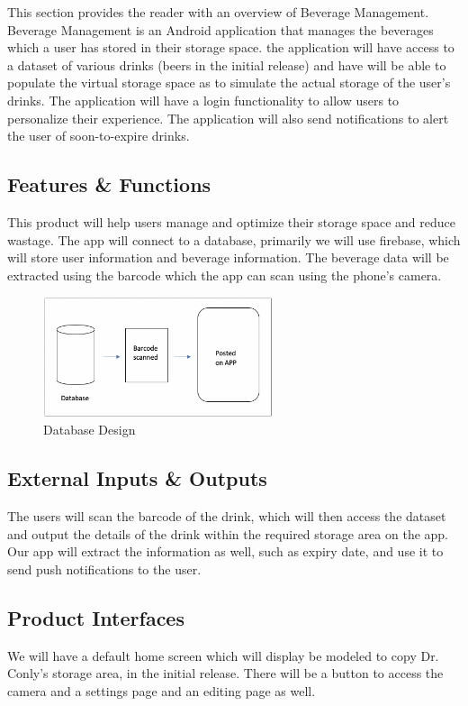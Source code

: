 This section provides the reader with an overview of Beverage Management. Beverage Management is an Android 
application that manages the beverages which a user has stored in their storage space. the application will have access
to a dataset of various drinks (beers in the initial release) and have will be able to populate the virtual storage 
space as to simulate the actual storage of the user's drinks. The application will have a login functionality to allow 
users to personalize their experience. The application will also send notifications to alert the user of 
soon-to-expire drinks.

\subsection{Features \& Functions}
This product will help users manage and optimize their storage space and reduce wastage. The app will connect to a database,
primarily we will use firebase, which will store user information and beverage information. The beverage data will be extracted
using the barcode which the app can scan using the phone's camera.

\begin{figure}[h!]
	\centering
   	\includegraphics[width=0.60\textwidth]{images/bevearge_data_request.png}
    \caption{ Database Design }
\end{figure}

\subsection{External Inputs \& Outputs}
The users will scan the barcode of the drink, which will then access the dataset and output the details of the drink within the required storage area on the app.
Our app will extract the information as well, such as expiry date, and use it to send push notifications to the user.

\subsection{Product Interfaces}
We will have a default home screen which will display be modeled to copy Dr. Conly's storage area, in the initial release. There 
will be a button to access the camera and a settings page and an editing page as well.

